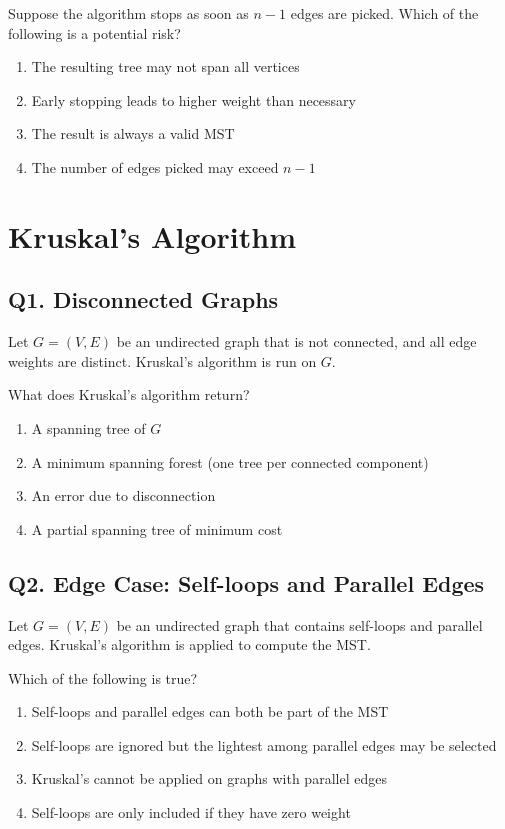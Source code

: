 Suppose the algorithm stops as soon as $n - 1$ edges are picked. Which of the following is a potential risk?

\begin{enumerate}[label=(\alph*)]
    \item The resulting tree may not span all vertices
    \item Early stopping leads to higher weight than necessary
    \item The result is always a valid MST
    \item The number of edges picked may exceed $n - 1$
\end{enumerate}

\newpage
\section{Kruskal's Algorithm}
\subsection*{Q1. Disconnected Graphs}
Let $G = (V, E)$ be an undirected graph that is not connected, and all edge weights are distinct. Kruskal's algorithm is run on $G$.

What does Kruskal's algorithm return?

\begin{enumerate}[label=(\alph*)]
    \item A spanning tree of $G$
    \item A minimum spanning forest (one tree per connected component)
    \item An error due to disconnection
    \item A partial spanning tree of minimum cost
\end{enumerate}

\subsection*{Q2. Edge Case: Self-loops and Parallel Edges}
Let $G = (V, E)$ be an undirected graph that contains self-loops and parallel edges. Kruskal's algorithm is applied to compute the MST.

Which of the following is true?

\begin{enumerate}[label=(\alph*)]
    \item Self-loops and parallel edges can both be part of the MST
    \item Self-loops are ignored but the lightest among parallel edges may be selected
    \item Kruskal's cannot be applied on graphs with parallel edges
    \item Self-loops are only included if they have zero weight
\end{enumerate}

